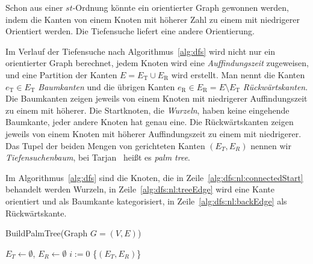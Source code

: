 \documentclass[a4paper]{scrreprt}
\theoremstyle{definition}
\begin{document}
Schon aus einer $st$-Ordnung könnte ein orientierter Graph gewonnen werden, indem die Kanten von einem Knoten mit höherer Zahl zu einem mit niedrigerer Orientiert werden. Die Tiefensuche liefert eine andere Orientierung.

Im Verlauf der Tiefensuche nach Algorithmus~\ref{alg:dfs} wird nicht nur ein orientierter Graph berechnet, jedem Knoten wird eine \emph{Auffindungszeit} zugeweisen, und eine Partition der Kanten $E = E_\text{T} \cup E_\text{R}$ wird erstellt. Man nennt die Kanten $e_\text{T} \in E_\text{T}$ \emph{Baumkanten} und die übrigen Kanten $e_\text{R} \in E_\text{R} =  E \setminus E_\text{T}$ \emph{Rückwärtskanten}. Die Baumkanten zeigen jeweils von einem Knoten mit niedrigerer Auffindungszeit zu einem mit höherer. Die Startknoten, die \emph{Wurzeln}, haben keine eingehende Baumkante, jeder andere Knoten hat genau eine. Die Rückwärtskanten zeigen jeweils von einem Knoten mit höherer Auffindungszeit zu einem mit niedrigerer. Das Tupel der beiden Mengen von gerichteten Kanten $(E_T, E_R)$ nennen wir \emph{Tiefensuchenbaum}, bei Tarjan~\cite{tarjan-72} heißt es \emph{palm tree}.

Im Algorithmus~\ref{alg:dfs} sind die Knoten, die in Zeile~\ref{alg:dfs:nl:connectedStart} behandelt werden Wurzeln, in Zeile~\ref{alg:dfs:nl:treeEdge} wird eine Kante orientiert und als Baumkante kategorisiert, in Zeile~\ref{alg:dfs:nl:backEdge} als Rückwärtskante.

\begin{algorithm}[ht]
  \caption{BuildPalmTree(Graph $G = (V,E)$)}
  \label{alg:dfs}
\BlankLine
  $E_T \leftarrow \emptyset$, $E_R \leftarrow \emptyset$ \;
  $i := 0$ \;
\BlankLine
\BlankLine
\BlankLine
    \Return\{$(E_T, E_R)$\}
\end{algorithm}
\end{document}
